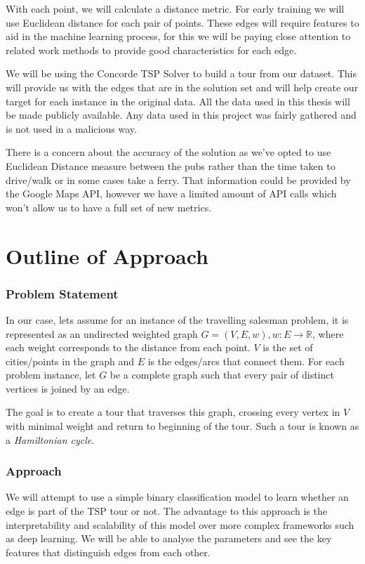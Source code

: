 \documentclass[]{UCD_CS_FYP_Report}
\begin{document}
With each point, we will calculate a distance metric. For early training we will use Euclidean distance for each pair of points. These edges will require features to aid in the machine learning process, for this we will be paying close attention to related work methods to provide good characteristics for each edge.

We will be using the Concorde TSP Solver \cite{davidapplegate2007} to build a tour from our dataset. This will provide us with the edges that are in the solution set and will help create our target for each instance in the original data.
All the data used in this thesis will be made publicly available. Any data used in this project was fairly gathered and is not used in a malicious way.

There is a concern about the accuracy of the solution as we’ve opted to use Euclidean Distance measure between the pubs rather than the time taken to drive/walk or in some cases take a ferry. That information could be provided by the Google Maps API, however we have a limited amount of API calls which won't allow us to have a full set of new metrics.


\chapter{Outline of Approach}
\subsection{Problem Statement}
In our case, lets assume for an instance of the travelling salesman problem, it is represented as an undirected weighted graph $G = (V, E, w), w:E\to\mathbb{R}$, where each weight corresponds to the distance from each point. $V$ is the set of cities/points in the graph and $E$ is the edges/arcs that connect them. For each problem instance, let $G$ be a complete graph such that every pair of distinct vertices is joined by an edge.

The goal is to create a tour that traverses this graph, crossing every vertex in $V$ with minimal weight and return to beginning of the tour. Such a tour is known as a \textit{Hamiltonian cycle}.

\subsection{Approach}
We will attempt to use a simple binary classification model to learn whether an edge is part of the TSP tour or not. The advantage to this approach is the interpretability and scalability of this model over more complex frameworks such as deep learning. We will be able to analyse the parameters and see the key features that distinguish edges from each other.
\end{document}
